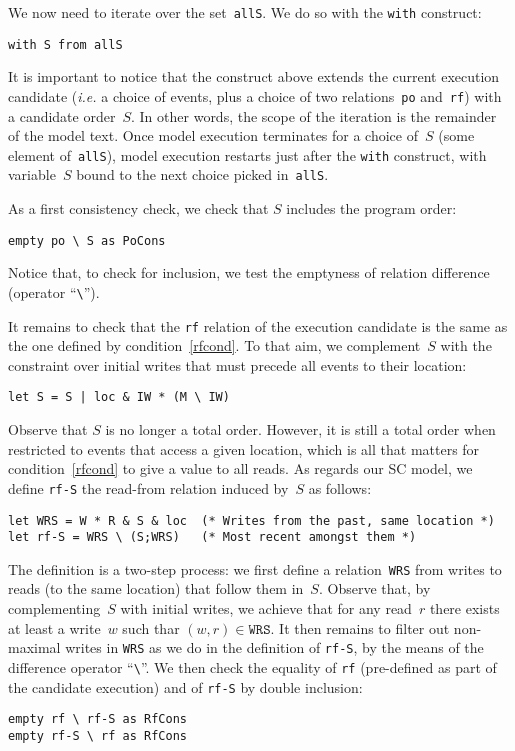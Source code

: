 \label{intro:with}We now need to iterate over the set~\verb+allS+.
We do so with the \verb+with+ construct:
\begin{verbatim}
with S from allS
\end{verbatim}
It is important to notice that the construct above extends the current
execution candidate (\emph{i.e.} a choice of events, plus a choice of
two relations~\texttt{po} and~\texttt{rf}) with a candidate order~$S$.
In other words, the scope of the iteration is the remainder of the model text.
Once model execution terminates for a choice of~$S$
(some element of~\texttt{allS}), model execution restarts just
after the \texttt{with} construct, with variable~$S$ bound to
the next choice picked in~\texttt{allS}.

As a first consistency check, we check that $S$ includes the program order:
\begin{verbatim}
empty po \ S as PoCons
\end{verbatim}
Notice that, to check for inclusion, we test the emptyness of relation
difference (operator ``\verb+\+'').


It remains to check that the \texttt{rf} relation of the execution candidate
is the same as the one defined by condition~\ref{rfcond}.
To that aim, we complement~$S$ with the constraint over initial
writes that  must precede all events to their location:
\begin{verbatim}
let S = S | loc & IW * (M \ IW)
\end{verbatim}
Observe that $S$ is no longer a total order. However, it is still a total
order when restricted to events that access a given location,
which is all that matters for condition~\ref{rfcond} to give a value
to all reads. As regards our SC model, we define \texttt{rf-S}
the read-from relation induced by~$S$ as follows:
\begin{verbatim}
let WRS = W * R & S & loc  (* Writes from the past, same location *)
let rf-S = WRS \ (S;WRS)   (* Most recent amongst them *)
\end{verbatim}
The definition is a two-step process: we first define
a relation~\texttt{WRS} from writes to reads (to the same location)
that follow them in~$S$. Observe that,
by complementing~$S$ with initial writes, we achieve that for any read~$r$
there exists at least a write~$w$ such thar $(w,r) \in \texttt{WRS}$.
It then remains to filter out non-maximal writes in \texttt{WRS}
as we do in the definition of \texttt{rf-S}, by the means of
the difference operator ``\verb+\+''.
We then check the equality of \texttt{rf} (pre-defined as part of the candidate
execution) and of \texttt{rf-S} by double inclusion:
\begin{verbatim}
empty rf \ rf-S as RfCons
empty rf-S \ rf as RfCons
\end{verbatim}

